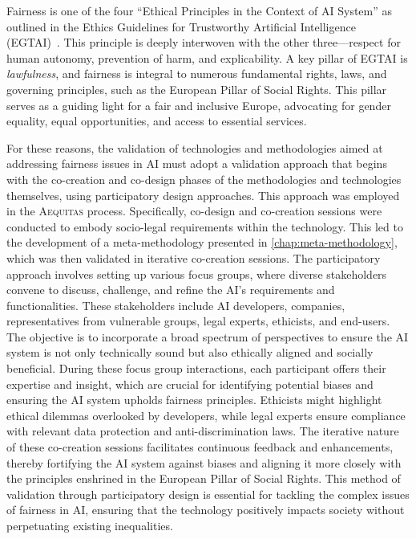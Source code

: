 \documentclass[12pt,a4paper,openright,twoside]{book}
\newcommand{\aequitas}{\textsc{Aequitas}}
\begin{document}
Fairness is one of the four ``Ethical Principles in the Context of AI System'' as outlined in the Ethics Guidelines for Trustworthy Artificial Intelligence (EGTAI)~\cite{AIHLEG2019}.
%
This principle is deeply interwoven with the other three---respect for human autonomy, prevention of harm, and explicability.
%
A key pillar of EGTAI is \textit{lawfulness}, and fairness is integral to numerous fundamental rights, laws, and governing principles, such as the European Pillar of Social Rights.
%
This pillar serves as a guiding light for a fair and inclusive Europe, advocating for gender equality, equal opportunities, and access to essential services.

For these reasons, the validation of technologies and methodologies aimed at addressing fairness issues in \ac{AI} must adopt a validation approach that begins with the co-creation and co-design phases of the methodologies and technologies themselves, using participatory design approaches.
%
This approach was employed in the \aequitas{} process.
%
Specifically, co-design and co-creation sessions were conducted to embody socio-legal requirements within the technology.
%
This led to the development of a meta-methodology presented in \cref{chap:meta-methodology}, which was then validated in iterative co-creation sessions.
%
The participatory approach involves setting up various focus groups, where diverse stakeholders convene to discuss, challenge, and refine the \ac{AI}'s requirements and functionalities.
%
These stakeholders include \ac{AI} developers, companies, representatives from vulnerable groups, legal experts, ethicists, and end-users.
%
The objective is to incorporate a broad spectrum of perspectives to ensure the \ac{AI} system is not only technically sound but also ethically aligned and socially beneficial.
%
During these focus group interactions, each participant offers their expertise and insight, which are crucial for identifying potential biases and ensuring the \ac{AI} system upholds fairness principles.
%
Ethicists might highlight ethical dilemmas overlooked by developers, while legal experts ensure compliance with relevant data protection and anti-discrimination laws.
%
The iterative nature of these co-creation sessions facilitates continuous feedback and enhancements, thereby fortifying the \ac{AI} system against biases and aligning it more closely with the principles enshrined in the European Pillar of Social Rights.
%
This method of validation through participatory design is essential for tackling the complex issues of fairness in \ac{AI}, ensuring that the technology positively impacts society without perpetuating existing inequalities.
\end{document}
